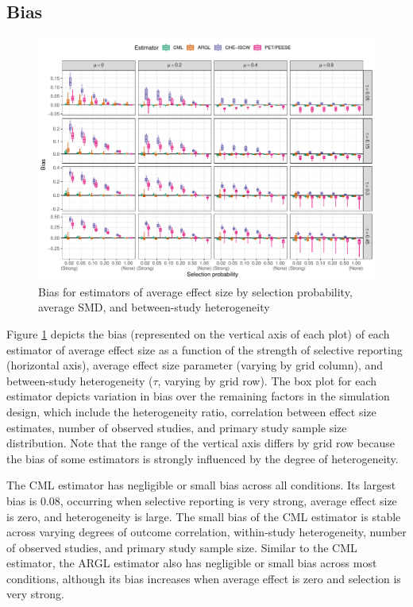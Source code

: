\documentclass[
  man, donotrepeattitle,floatsintext]{apa7}
\begin{document}
\subsection{Bias}\label{bias}

\begin{figure}
\includegraphics{step-function-selection-models-with-dependent-effects_files/figure-latex/mu-bias-1} \caption{Bias for estimators of average effect size by selection probability, average SMD, and between-study heterogeneity}\label{fig:mu-bias}
\end{figure}

Figure \ref{fig:mu-bias} depicts the bias (represented on the vertical axis of each plot) of each estimator of average effect size as a function of the strength of selective reporting (horizontal axis), average effect size parameter (varying by grid column), and between-study heterogeneity (\(\tau\), varying by grid row).
The box plot for each estimator depicts variation in bias over the remaining factors in the simulation design, which include the heterogeneity ratio, correlation between effect size estimates, number of observed studies, and primary study sample size distribution.
Note that the range of the vertical axis differs by grid row because the bias of some estimators is strongly influenced by the degree of heterogeneity.

The CML estimator has negligible or small bias across all conditions.
Its largest bias is 0.08, occurring when selective reporting is very strong, average effect size is zero, and heterogeneity is large.
The small bias of the CML estimator is stable across varying degrees of outcome correlation, within-study heterogeneity, number of observed studies, and primary study sample size.
Similar to the CML estimator, the ARGL estimator also has negligible or small bias across most conditions, although its bias increases when average effect is zero and selection is very strong.
\end{document}
